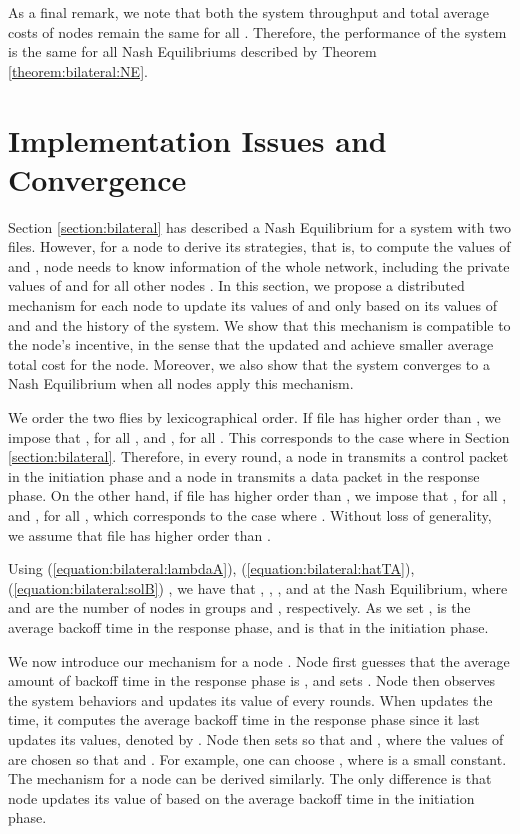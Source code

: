 \documentclass[11pt, conference]{IEEEtran}
\begin{document}
As a final remark, we note that both the system throughput and total average costs of nodes remain the same for all . Therefore, the performance of the system is the same for all Nash Equilibriums described by Theorem \ref{theorem:bilateral:NE}.



\section{Implementation Issues and Convergence}	\label{section:implementation}

Section \ref{section:bilateral} has described a Nash Equilibrium for a system with two files. However, for a node  to derive its strategies, that is, to compute the values of  and , node  needs to know information of the whole network, including the private values of  and  for all other nodes . In this section, we propose a distributed mechanism for each node to update its values of  and  only based on its values of  and  and the history of the system. We show that this mechanism is compatible to the node's incentive, in the sense that the updated  and  achieve smaller average total cost for the node. Moreover, we also show that the system converges to a Nash Equilibrium when all nodes apply this mechanism.

We order the two flies by lexicographical order. If file  has higher order than , we impose that , for all , and , for all . This corresponds to the case where  in Section \ref{section:bilateral}. Therefore, in every round, a node in  transmits a control packet in the initiation phase and a node in  transmits a data packet in the response phase. On the other hand, if file  has higher order than , we impose that , for all , and , for all , which corresponds to the case where . Without loss of generality, we assume that file  has higher order than .

Using (\ref{equation:bilateral:lambdaA}), (\ref{equation:bilateral:hatTA}), (\ref{equation:bilateral:solB}) , we have that , , , and  at the Nash Equilibrium, where  and  are the number of nodes in groups  and , respectively. As we set ,  is the average backoff time in the response phase, and  is that in the initiation phase.

We now introduce our mechanism for a node . Node  first guesses that the average amount of backoff time in the response phase is , and sets . Node  then observes the system behaviors and updates its value of  every  rounds. When  updates  the  time, it computes the average backoff time in the response phase since it last updates its values, denoted by . Node  then sets  so that  and , where the values of  are chosen so that  and . For example, one can choose , where  is a small constant.  The mechanism for a node  can be derived similarly. The only difference is that node  updates its value of  based on the average backoff time in the initiation phase.
\end{document}
